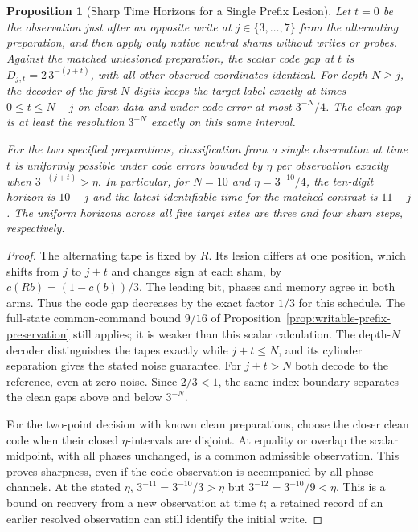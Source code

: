 \documentclass[11pt,a4paper]{article}
\newtheorem{proposition}[theorem]{Proposition}
\theoremstyle{definition}
\begin{document}
\begin{proposition}[Sharp Time Horizons for a Single Prefix Lesion]\label{prop:writable-tower-legibility-horizon}
Let $t=0$ be the observation just after an opposite write at $j\in\{3,\ldots,7\}$ from the alternating preparation, and then apply only native neutral shams without writes or probes. Against the matched unlesioned preparation, the scalar code gap at $t$ is $D_{j,t}=2\,3^{-(j+t)}$, with all other observed coordinates identical. For depth $N\ge j$, the decoder of the first $N$ digits keeps the target label exactly at times $0\le t\le N-j$ on clean data and under code error at most $3^{-N}/4$. The clean gap is at least the resolution $3^{-N}$ exactly on this same interval.

For the two specified preparations, classification from a single observation at time $t$ is uniformly possible under code errors bounded by $\eta$ per observation exactly when $3^{-(j+t)}>\eta$. In particular, for $N=10$ and $\eta=3^{-10}/4$, the ten-digit horizon is $10-j$ and the latest identifiable time for the matched contrast is $11-j$. The uniform horizons across all five target sites are three and four sham steps, respectively.
\end{proposition}
\begin{proof}
The alternating tape is fixed by $R$. Its lesion differs at one position, which shifts from $j$ to $j+t$ and changes sign at each sham, by $c(Rb)=(1-c(b))/3$. The leading bit, phases and memory agree in both arms. Thus the code gap decreases by the exact factor $1/3$ for this schedule. The full-state common-command bound $9/16$ of Proposition~\ref{prop:writable-prefix-preservation} still applies; it is weaker than this scalar calculation. The depth-$N$ decoder distinguishes the tapes exactly while $j+t\le N$, and its cylinder separation gives the stated noise guarantee. For $j+t>N$ both decode to the reference, even at zero noise. Since $2/3<1$, the same index boundary separates the clean gaps above and below $3^{-N}$.

For the two-point decision with known clean preparations, choose the closer clean code when their closed $\eta$-intervals are disjoint. At equality or overlap the scalar midpoint, with all phases unchanged, is a common admissible observation. This proves sharpness, even if the code observation is accompanied by all phase channels. At the stated $\eta$, $3^{-11}=3^{-10}/3>\eta$ but $3^{-12}=3^{-10}/9<\eta$. This is a bound on recovery from a new observation at time $t$; a retained record of an earlier resolved observation can still identify the initial write.
\end{proof}
\end{document}
